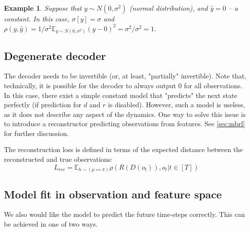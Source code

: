 \documentclass[a4paper,11pt,oneside]{report}
\newtheorem{example}{Example}[section]
\begin{document}
\begin{example}
    Suppose that $y\sim N(0, \sigma^2)$ (normal distribution), and $\hat{y}=0$ -- a constant. In this case, $\sigma[y]=\sigma$ and $\rho(y, \hat{y})= 1/\sigma^2 \mathbb E_{y\sim N(0, \sigma^2)}(y-0)^2=\sigma^2/\sigma^2=1$.
\end{example}

\subsection{Degenerate decoder}
The decoder needs to be invertible (or, at least, "partially" invertible). Note that, technically, it is possible for the decoder to always output $0$ for all observations. In this case, there exist a simple constant model that "predicts" the next state perfectly (if prediction for $d$ and $r$ is disabled). However, such a model is useless, as it does not describe any aspect of the dynamics. One way to solve this issue is to introduce a reconstructor predicting observations from features. See \autoref{sec:mbrl} for further discussion.

The reconstruction loss is defined in terms of the expected distance between the reconstructed and true observations:
\begin{equation}
\label{eq:reconstruction_loss}
L_{rec}=\mathbb E_{h\sim (\mu\leftrightarrow \pi)}\rho(R(D(o_t)), o_t|t\in [T])
\end{equation}

\subsection{Model fit in observation and feature space}
We also would like the model to predict the future time-steps correctly. This can be achieved in one of two ways.
\end{document}
